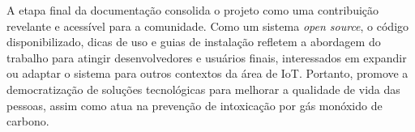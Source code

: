 A etapa final da documentação consolida o projeto como uma contribuição revelante e acessível para a comunidade. Como um sistema \textit{open source}, o código disponibilizado, dicas de uso e guias de instalação refletem a abordagem 
do trabalho para atingir desenvolvedores e usuários finais, interessados em expandir ou adaptar o sistema para outros contextos da área de IoT. Portanto, promove a democratização de soluções tecnológicas para melhorar a qualidade de 
vida das pessoas, assim como atua na prevenção de intoxicação por gás monóxido de carbono.
